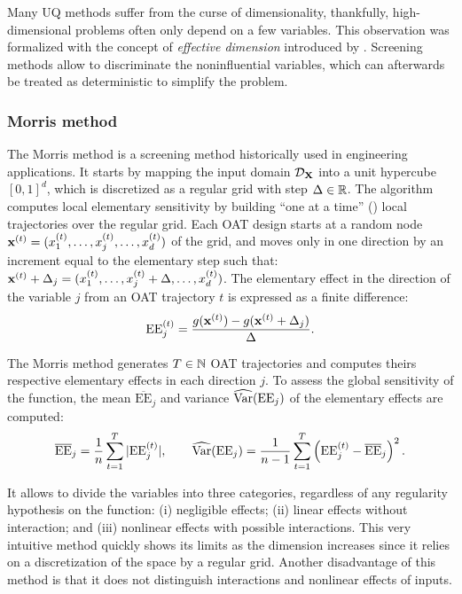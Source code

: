 Many UQ methods suffer from the curse of dimensionality, thankfully, high-dimensional problems often only depend on a few variables. 
This observation was formalized with the concept of \textit{effective dimension} introduced by \citet{owen_2003}. 
Screening methods allow to discriminate the noninfluential variables, which can afterwards be treated as deterministic to simplify the problem.

\subsubsection{Morris method}

The Morris method \citep{morris_1991} is a screening method historically used in engineering applications. 
It starts by mapping the input domain $\mathcal{D}_{{\bf X}}$ into a unit hypercube $[0, 1]^d$, which is discretized as a regular grid with step $\Delta \in \mathbb{R}$. 
The algorithm computes local elementary sensitivity by building ``one at a time'' () local trajectories over the regular grid. 
Each OAT design starts at a random node ${\bf x}^{(t)} = (x^{(t)}_1, \dots, x^{(t)}_j,\dots, x^{(t)}_d)$ of the grid, and moves only in one direction by an increment equal to the elementary step such that: ${\bf x}^{(t)} + \Delta_j = (x^{(t)}_1, \dots, x^{(t)}_j + \Delta ,\dots, x^{(t)}_d)$. 
The elementary effect in the direction of the variable $j$ from an OAT trajectory $t$ is expressed as a finite difference: 
\begin{equation}
    \mathrm{EE}_j^{(t)} = \frac{g({\bf x}^{(t)}) - g({\bf x}^{(t)} + \Delta_j)}{\Delta}.
    \label{eq:eeffect}
\end{equation}

The Morris method generates $T\in\mathbb{N}$ OAT trajectories and computes theirs respective elementary effects in each direction $j$. 
To assess the global sensitivity of the function, the mean $\overline{\mathrm{EE}}_j$ and variance $\widehat{\operatorname{Var}}(\mathrm{EE}_j)$ of the elementary effects are computed: 
\begin{equation}
    \overline{\mathrm{EE}}_j = \frac1n \sum_{t=1}^{T} |\mathrm{EE}_j^{(t)}|, \qquad 
    \widehat{\operatorname{Var}}(\mathrm{EE}_j) = \frac{1}{n-1} \sum_{t=1}^{T} \left(\mathrm{EE}_j^{(t)} - \overline{\mathrm{EE}}_j\right)^2.
\end{equation}  


It allows to divide the variables into three categories, regardless of any regularity hypothesis on the function: 
(i) negligible effects; (ii) linear effects without interaction; and (iii) nonlinear effects with possible interactions. 
This very intuitive method quickly shows its limits as the dimension increases since it relies on a discretization of the space by a regular grid. 
Another disadvantage of this method is that it does not distinguish interactions and nonlinear effects of inputs.


